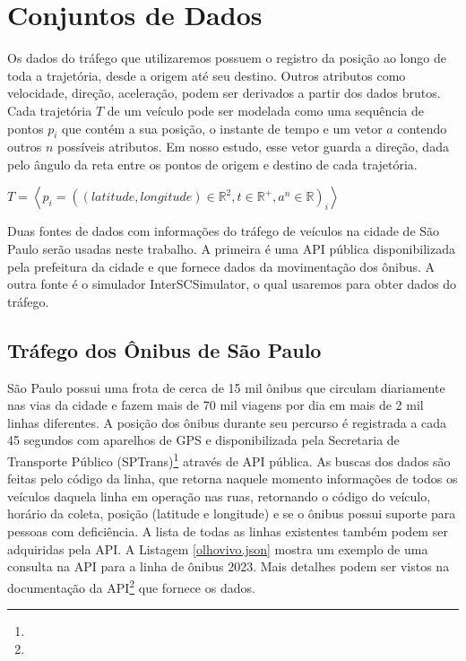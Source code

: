 \section{Conjuntos de Dados}
   Os dados do tráfego que utilizaremos possuem o registro da posição ao longo
de toda a trajetória, desde a origem até seu destino. Outros atributos como velocidade,
direção, aceleração, podem ser derivados a partir dos dados brutos. Cada trajetória $T$ de um
veículo pode ser modelada como uma sequência de pontos $p_i$ que contém a sua
posição, o instante de tempo e um vetor $a$ contendo outros $n$ possíveis atributos. Em
nosso estudo, esse vetor guarda a direção, dada pelo ângulo da reta
entre os pontos de origem e destino de cada trajetória.

\begin{center}
$T = \left\langle p_i = ((latitude, longitude) \in \mathbb{R}^2, t \in \mathbb{R}^+, a^n \in \mathbb{R})_i \right\rangle$
\end{center}

  Duas fontes de dados com informações do tráfego de veículos na cidade de São
Paulo serão usadas neste trabalho. A primeira é uma API pública disponibilizada
pela prefeitura da cidade e que fornece dados da movimentação dos ônibus. A
outra fonte é o simulador InterSCSimulator, o qual usaremos para obter dados
do tráfego.

\subsection{Tráfego dos Ônibus de São Paulo} São Paulo possui uma frota de
cerca de 15 mil ônibus que circulam diariamente nas vias da cidade e fazem mais
de 70 mil viagens por dia em mais de 2 mil linhas diferentes. A posição dos
ônibus durante seu percurso é registrada a cada 45 segundos com aparelhos de
GPS e disponibilizada pela Secretaria de Transporte Público
(SPTrans)\footnote{} através de API pública. As buscas
dos dados são feitas pelo código da linha, que retorna naquele momento
informações de todos os veículos daquela linha em operação nas ruas, retornando
o código do veículo, horário da coleta, posição (latitude e longitude) e se o
ônibus possui suporte para pessoas com deficiência. A lista de todas as linhas
existentes também podem ser adquiridas pela API.  A Listagem
\ref{olhovivo.json} mostra um exemplo de uma consulta na API para a linha de
ônibus 2023. Mais detalhes podem ser vistos na documentação da
API\footnote{}
que fornece os dados.

